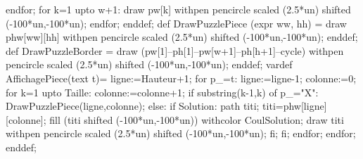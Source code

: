 {  endfor;
  for k=1 upto w+1:
    draw pw[k] withpen pencircle scaled (2.5*un) shifted (-100*un,-100*un);
  endfor;
enddef;
def DrawPuzzlePiece (expr ww, hh) =
draw phw[ww][hh] withpen pencircle scaled (2.5*un) shifted (-100*un,-100*un);
enddef;
def DrawPuzzleBorder =
draw (pw[1]--ph[1]--pw[w+1]--ph[h+1]--cycle)
withpen pencircle scaled (2.5*un) shifted (-100*un,-100*un);
enddef;
%
vardef AffichagePiece(text t)=
ligne:=Hauteur+1;
for p_=t:
ligne:=ligne-1;
colonne:=0;
for k=1 upto Taille:
colonne:=colonne+1;
if substring(k-1,k) of p_="X":
DrawPuzzlePiece(ligne,colonne);
else:
if Solution:
path titi;
titi=phw[ligne][colonne];
fill (titi shifted (-100*un,-100*un)) withcolor CoulSolution;
draw titi withpen pencircle scaled (2.5*un) shifted (-100*un,-100*un);
fi;
fi;
endfor;
endfor;
enddef;
}%

\NewDocumentCommand{}%